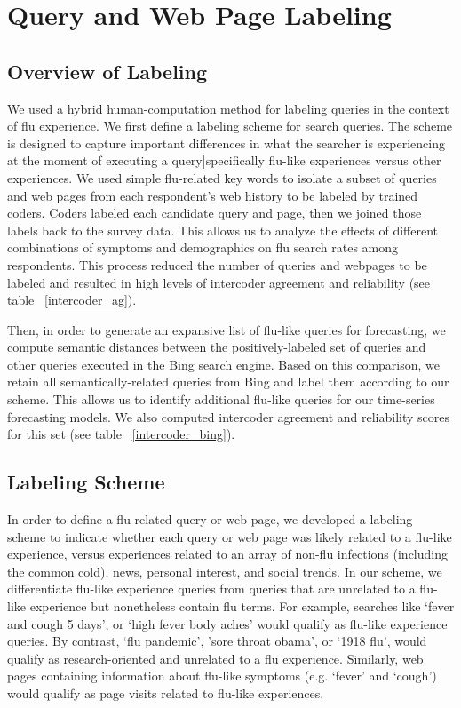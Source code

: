 \documentclass[12pt]{article}
\begin{document}

\section{Query and Web Page Labeling}

\subsection*{Overview of Labeling}
We used a hybrid human-computation method for labeling queries in the context of flu experience. We first define a labeling scheme for search queries. The scheme is designed to capture important differences in what the searcher is experiencing at the moment of executing a query|specifically flu-like experiences versus other experiences. 
We used simple flu-related key words to isolate a subset of queries and web pages from each respondent's web history to be labeled by trained coders. Coders labeled each candidate query and page, then we joined those labels back to the survey data. This allows us to analyze the effects of different combinations of symptoms and demographics on flu search rates among respondents. This process reduced the number of queries and webpages to be labeled and resulted in high levels of intercoder agreement and reliability (see table ~\ref{intercoder_ag}).

Then, in order to generate an expansive list of flu-like queries for forecasting, we compute semantic distances between the positively-labeled set of queries and other queries executed in the Bing search engine. Based on this comparison, we retain all semantically-related queries from Bing and label them according to our scheme. This allows us to identify additional flu-like queries for our time-series forecasting models. We also computed intercoder agreement and reliability scores for this set (see table ~\ref{intercoder_bing}). 

\subsection*{Labeling Scheme}

In order to define a flu-related query or web page, we developed a labeling scheme to indicate whether each query or web page was likely related to a flu-like experience, versus experiences related to an array of non-flu infections (including the common cold), news, personal interest, and social trends. In our scheme, we differentiate flu-like experience queries from queries that are unrelated to a flu-like experience but nonetheless contain flu terms. For example, searches like `fever and cough 5 days', or `high fever body aches' would qualify as flu-like experience queries. By contrast, `flu pandemic', 'sore throat obama', or `1918 flu', would qualify as research-oriented and unrelated to a flu experience. Similarly, web pages containing information about flu-like symptoms (e.g. `fever' and `cough') would qualify as page visits related to flu-like experiences. 
\end{document}

